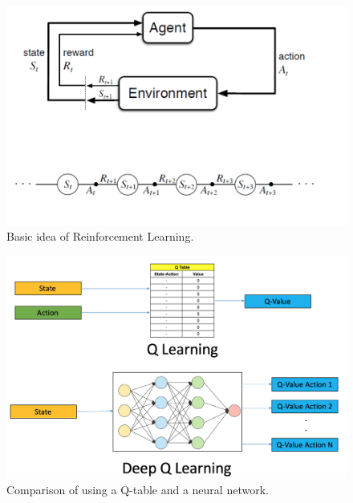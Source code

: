 \documentclass[runningheads,envcountsect]{llncs}
\begin{document}
\begin{figure}[t]
  \centering
  \includegraphics[scale=0.7]{img/rl_base.png}
  \caption{Basic idea of Reinforcement Learning.}
  \label{fig:rl}
\end{figure}

\begin{figure}[t]
  \centering
  \includegraphics[scale=0.3]{img/dql.png}
  \caption{Comparison of using a Q-table and a neural network.}
  \label{fig:dql}
\end{figure}
\end{document}
